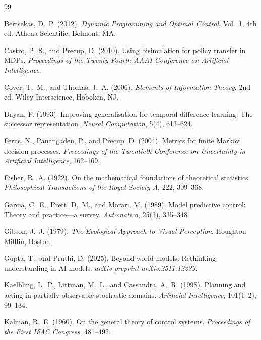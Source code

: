 \documentclass[11pt, a4paper]{article}
\theoremstyle{plain}
\theoremstyle{definition}
\theoremstyle{remark}
\begin{document}
\begin{thebibliography}{99}

Bertsekas, D.~P. (2012).
\textit{Dynamic Programming and Optimal Control}, Vol.~1, 4th ed.
Athena Scientific, Belmont, MA.

Castro, P.~S., and Precup, D. (2010).
Using bisimulation for policy transfer in MDPs.
\textit{Proceedings of the Twenty-Fourth AAAI Conference on Artificial
Intelligence}.

Cover, T.~M., and Thomas, J.~A. (2006).
\textit{Elements of Information Theory}, 2nd ed.
Wiley-Interscience, Hoboken, NJ.

Dayan, P. (1993).
Improving generalisation for temporal difference learning: The successor
representation.
\textit{Neural Computation}, 5(4), 613--624.

Ferns, N., Panangaden, P., and Precup, D. (2004).
Metrics for finite Markov decision processes.
\textit{Proceedings of the Twentieth Conference on Uncertainty in Artificial
Intelligence}, 162--169.

Fisher, R.~A. (1922).
On the mathematical foundations of theoretical statistics.
\textit{Philosophical Transactions of the Royal Society A}, 222, 309--368.

Garcia, C.~E., Prett, D.~M., and Morari, M. (1989).
Model predictive control: Theory and practice---a survey.
\textit{Automatica}, 25(3), 335--348.

Gibson, J.~J. (1979).
\textit{The Ecological Approach to Visual Perception}.
Houghton Mifflin, Boston.

Gupta, T., and Pruthi, D. (2025).
Beyond world models: Rethinking understanding in AI models.
\textit{arXiv preprint arXiv:2511.12239}.

Kaelbling, L.~P., Littman, M.~L., and Cassandra, A.~R. (1998).
Planning and acting in partially observable stochastic domains.
\textit{Artificial Intelligence}, 101(1--2), 99--134.

Kalman, R.~E. (1960).
On the general theory of control systems.
\textit{Proceedings of the First IFAC Congress}, 481--492.


\end{thebibliography}
\end{document}
